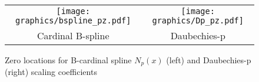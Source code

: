 
\begin{figure}
  \centering%
  \begin{tabular*}{\textwidth-40mm}{@{\extracolsep{\fill}}cc}%
    \texttt{[image: graphics/bspline\_pz.pdf]}&\texttt{[image: graphics/Dp\_pz.pdf]}\\%
    Cardinal B-spline&Daubechies-p%
  \end{tabular*}%
  \caption{
     Zero locations for B-cardinal spline $N_p(x)$ (left) and
     Daubechies-p (right) scaling coefficients
     \label{fig:Dp_limits}
     }
\end{figure}

%  

